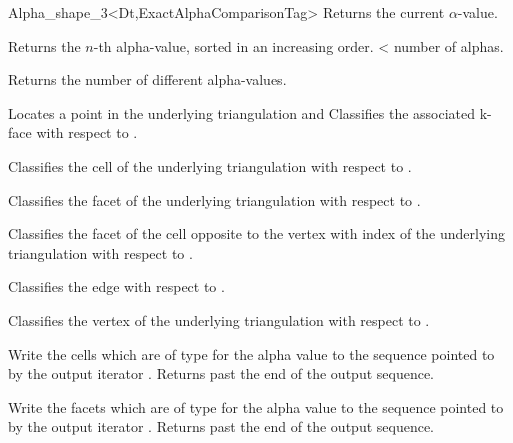 \begin{ccRefClass} {Alpha_shape_3<Dt,ExactAlphaComparisonTag>}
{Returns the current $\alpha$-value.}

{Returns the $n$-th alpha-value, sorted in an increasing order.
 \ccPrecond {} < number of alphas.}

{Returns the number of different alpha-values.}

{Locates a point   in the underlying triangulation and Classifies the 
associated k-face with respect to .}

{Classifies the cell  of the underlying triangulation with
respect 
to .}

{Classifies the facet  of the underlying triangulation with
respect to .}

{Classifies the facet of the cell  opposite to the vertex with index
of the underlying triangulation with respect to .}

{Classifies the edge  with respect to  . }

{Classifies the vertex  of the underlying triangulation with respect to .}

{Write the cells which are of type  for 
the alpha value  to the sequence
pointed to by the output iterator . Returns past the end
of the output sequence.}


{Write the facets which are of type  for 
the alpha value  to the sequence
pointed to by the output iterator . Returns past the end
of the output sequence.}


\end{ccRefClass}
